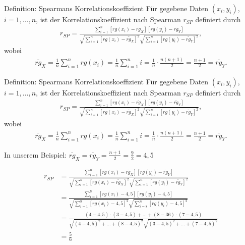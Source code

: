 \documentclass[t,11pt]{beamer}
\begin{document}
\begin{frame}
\begin{alertblock}{Definition: Spearmans Korrelationskoeffizient}
	Für gegebene Daten $(x_i,y_i)$, $i=1,\dots,n$, ist der Korrelationskoeffizient nach Spearman $r_{SP}$ definiert durch
	\begin{align*}
	r_{SP}=\frac{\sum_{i=1}^{n}\left[rg(x_i)-\bar{rg}_X\right]\left[rg(y_i)-\bar{rg}_Y\right]}{\sqrt{\sum_{i=1}^{n}\left[rg(x_i)-\bar{rg}_X\right]^2}\sqrt{\sum_{i=1}^{n}\left[rg(y_i)-\bar{rg}_Y\right]^2}},
	\end{align*}
	wobei
	\begin{align*}
	\bar{rg}_X=\frac{1}{n}\sum_{i=1}^{n}rg(x_i)=\frac{1}{n}\sum_{i=1}^{n}i=\frac{1}{n}\cdot\frac{n(n+1)}{2}=\frac{n+1}{2}=\bar{rg}_Y.
	\end{align*}
\end{alertblock}
\end{frame}


\begin{frame}
	\begin{alertblock}{Definition: Spearmans Korrelationskoeffizient}
		Für gegebene Daten $(x_i,y_i)$, $i=1,\dots,n$, ist der Korrelationskoeffizient nach Spearman $r_{SP}$ definiert durch
		\begin{align*}
			r_{SP}=\frac{\sum_{i=1}^{n}\left[rg(x_i)-\bar{rg}_X\right]\left[rg(y_i)-\bar{rg}_Y\right]}{\sqrt{\sum_{i=1}^{n}\left[rg(x_i)-\bar{rg}_X\right]^2}\sqrt{\sum_{i=1}^{n}\left[rg(y_i)-\bar{rg}_Y\right]^2}},
		\end{align*}
		wobei
		\begin{align*}
		\bar{rg}_X=\frac{1}{n}\sum_{i=1}^{n}rg(x_i)=\frac{1}{n}\sum_{i=1}^{n}i=\frac{1}{n}\cdot\frac{n(n+1)}{2}=\frac{n+1}{2}=\bar{rg}_Y.
		\end{align*}
	\end{alertblock}
\vspace{0.5cm}
	In unserem Beispiel: $\bar{rg}_X=\bar{rg}_Y=\frac{n+1}{2}=\frac{9}{2}=4,5$
\end{frame}

\begin{frame}
	\begin{align*}
		r_{SP} &= \frac{\sum_{i=1}^{n}\left[rg(x_i)-\bar{rg}_X\right]\left[rg(y_i)-\bar{rg}_Y\right]}{\sqrt{\sum_{i=1}^{n}\left[rg(x_i)-\bar{rg}_X\right]^2}\sqrt{\sum_{i=1}^{n}\left[rg(y_i)-\bar{rg}_Y\right]^2}} \\
		&= \frac{\sum_{i=1}^{8}\left[rg(x_i)-4,5\right]\left[rg(y_i)-4,5\right]}{\sqrt{\sum_{i=1}^{8}\left[rg(x_i)-4,5\right]^2}\sqrt{\sum_{i=8}^{n}\left[rg(y_i)-4,5\right]^2}}\\
		&= \frac{(4-4,5)\cdot (3-4,5)+\dots+(8-36)\cdot (7-4,5)}{\sqrt{(4-4,5)^2+\dots+(8-4,5)^2}\sqrt{(3-4,5)^2+\dots+(7-4,5)^2}} \\
		&= \frac{5}{6}
	\end{align*}
\end{frame}
\end{document}
